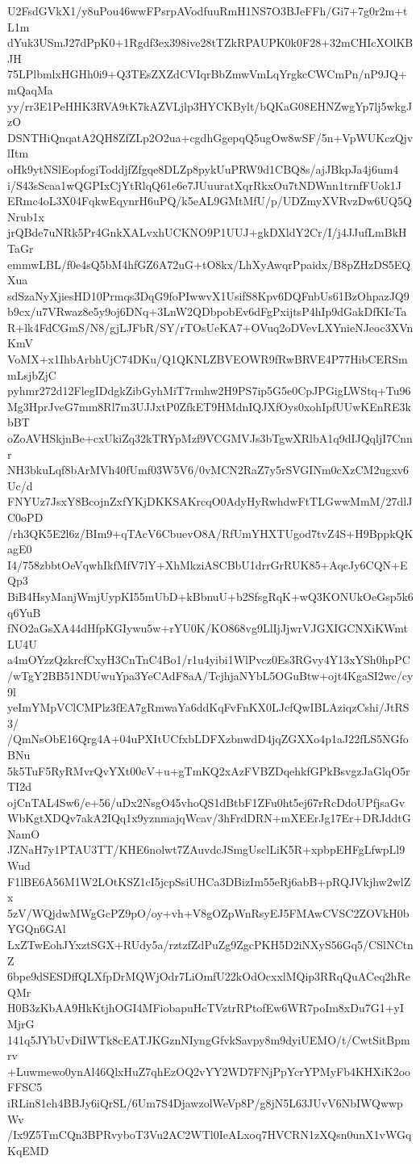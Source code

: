 U2FsdGVkX1/y8uPou46wwFPsrpAVodfuuRmH1NS7O3BJeFFh/Gi7+7g0r2m+tL1m
dYuk3USmJ27dPpK0+1Rgdf3ex398ive28tTZkRPAUPK0k0F28+32mCHIcXOlKBJH
75LPlbmlxHGHh0i9+Q3TEsZXZdCVIqrBbZmwVmLqYrgkcCWCmPn/nP9JQ+mQaqMa
yy/rr3E1PeHHK3RVA9tK7kAZVLjlp3HYCKBylt/bQKaG08EHNZwgYp7lj5wkgJzO
DSNTHiQnqatA2QH8ZfZLp2O2ua+cgdhGgepqQ5ugOw8wSF/5n+VpWUKczQjvlItm
oHk9ytNSlEopfogiToddjfZfgqe8DLZp8pykUuPRW9d1CBQ8s/ajJBkpJa4j6um4
i/S43sScaa1wQGPIxCjYtRlqQ61e6e7JUuuratXqrRkxOu7tNDWnn1trnfFUok1J
ERmc4oL3X04FqkwEqynrH6uPQ/k5eAL9GMtMfU/p/UDZmyXVRvzDw6UQ5QNrub1x
jrQBde7uNRk5Pr4GnkXALvxhUCKNO9P1UUJ+gkDXldY2Cr/I/j4JJufLmBkHTaGr
emmwLBL/f0e4sQ5bM4hfGZ6A72uG+tO8kx/LhXyAwqrPpaidx/B8pZHzDS5EQXua
sdSzaNyXjiesHD10Prmqs3DqG9foPIwwvX1UsifS8Kpv6DQFnbUs61BzOhpazJQ9
b9cx/u7VRwaz8e5y9oj6DNq+3LnW2QDbpobEv6dFgPxijtsP4hIp9dGakDfKIcTa
R+lk4FdCGmS/N8/gjLJFbR/SY/rTOsUeKA7+OVuq2oDVevLXYnieNJeoc3XVnKmV
VoMX+x1IhbArbhUjC74DKu/Q1QKNLZBVEOWR9fRwBRVE4P77HibCERSmmLsjbZjC
pyhmr272d12FlegIDdgkZibGyhMiT7rmhw2H9PS7ip5G5e0CpJPGigLWStq+Tu96
Mg3HprJveG7mm8Rl7m3UJJxtP0ZfkET9HMdnIQJXfOys0xohIpfUUwKEnRE3kbBT
oZoAVHSkjnBe+cxUkiZq32kTRYpMzf9VCGMVJs3bTgwXRlbA1q9dIJQqljI7Cnnr
NH3bkuLqf8bArMVh40fUmf03W5V6/0vMCN2RaZ7y5rSVGINm0cXzCM2ugxv6Uc/d
FNYUz7JsxY8BcojnZxfYKjDKKSAKrcqO0AdyHyRwhdwFtTLGwwMmM/27dlJC0oPD
/rh3QK5E2l6z/BIm9+qTAcV6CbuevO8A/RfUmYHXTUgod7tvZ4S+H9BppkQKagE0
I4/758zbbtOeVqwhIkfMfV7lY+XhMkziASCBbU1drrGrRUK85+AqcJy6CQN+EQp3
BiB4HsyManjWmjUypKI55mUbD+kBbnuU+b2SfsgRqK+wQ3KONUkOeGsp5k6q6YuB
fNO2aGsXA44dHfpKGIywu5w+rYU0K/KO868vg9LlIjJjwrVJGXIGCNXiKWmtLU4U
a4mOYzzQzkrcfCxyH3CnTnC4Bo1/r1u4yibi1WlPvcz0Es3RGvy4Y13xYSh0hpPC
/wTgY2BB51NDUwuYpa3YeCAdF8aA/TcjhjaNYbL5OGuBtw+ojt4KgaSI2wc/cy9l
yeImYMpVClCMPlz3fEA7gRmwaYa6ddKqFvFnKX0LJcfQwIBLAziqzCshi/JtRS3/
/QmNsObE16Qrg4A+04uPXItUCfxbLDFXzbnwdD4jqZGXXo4p1aJ22fLS5NGfoBNu
5k5TuF5RyRMvrQvYXt00cV+u+gTmKQ2xAzFVBZDqehkfGPkBsvgzJaGlqO5rTI2d
ojCnTAL4Sw6/e+56/uDx2NsgO45vhoQS1dBtbF1ZFu0ht5ej67rRcDdoUPfjsaGv
WbKgtXDQv7akA2IQq1x9yznmajqWcav/3hFrdDRN+mXEErJg17Er+DRJddtGNamO
JZNaH7y1PTAU3TT/KHE6nolwt7ZAuvdcJSmgUsclLiK5R+xpbpEHFgLfwpLl9Wud
F1lBE6A56M1W2LOtKSZ1cI5jcpSsiUHCa3DBizIm55eRj6abB+pRQJVkjhw2wlZx
5zV/WQjdwMWgGcPZ9pO/oy+vh+V8gOZpWnRsyEJ5FMAwCVSC2ZOVkH0bYGQn6GAl
LxZTwEohJYxztSGX+RUdy5a/rztzfZdPuZg9ZgcPKH5D2iNXyS56Gq5/CSlNCtnZ
6bpe9dSESDffQLXfpDrMQWjOdr7LiOmfU22kOdOcxxlMQip3RRqQuACeq2hReQMr
H0B3zKbAA9HkKtjhOGI4MFiobapuHcTVztrRPtofEw6WR7poIm8xDu7G1+yIMjrG
141q5JYbUvDiIWTk8cEATJKGznNIyngGfvkSavpy8m9dyiUEMO/t/CwtSitBpmrv
+Luwmewo0ynAl46QlxHuZ7qhEzOQ2vYY2WD7FNjPpYcrYPMyFb4KHXiK2ooFFSC5
iRLin81eh4BBJy6iQrSL/6Um7S4DjawzolWeVp8P/g8jN5L63JUvV6NbIWQwwpWv
/Ix9Z5TmCQn3BPRvyboT3Vu2AC2WTl0IeALxoq7HVCRN1zXQsn0unX1vWGqKqEMD

